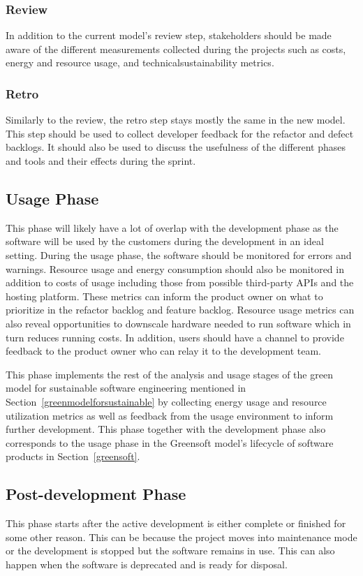 \subsubsection{Review}
In addition to the current model's review step, stakeholders should be made aware of the different measurements collected during the projects such as costs, energy and resource usage, and \gls{technicalsustainability} metrics.

\subsubsection{Retro}
Similarly to the review, the retro step stays mostly the same in the new model. This step should be used to collect developer feedback for the refactor and defect backlogs. It should also be used to discuss the usefulness of the different phases and tools and their effects during the sprint.

\subsection{Usage Phase}
This phase will likely have a lot of overlap with the development phase as the software will be used by the customers during the development in an ideal setting. During the usage phase, the software should be monitored for errors and warnings. Resource usage and energy consumption should also be monitored in addition to costs of usage including those from possible third-party APIs and the hosting platform. These metrics can inform the product owner on what to prioritize in the refactor backlog and feature backlog. Resource usage metrics can also reveal opportunities to downscale hardware needed to run software which in turn reduces running costs. In addition, users should have a channel to provide feedback to the product owner who can relay it to the development team.

This phase implements the rest of the analysis and usage stages of the green model for sustainable software engineering mentioned in Section~\ref{greenmodelforsustainable} by collecting energy usage and resource utilization metrics as well as feedback from the usage environment to inform further development. This phase together with the development phase also corresponds to the usage phase in the Greensoft model's lifecycle of software products in Section~\ref{greensoft}.

\subsection{Post-development Phase}
This phase starts after the active development is either complete or finished for some other reason. This can be because the project moves into maintenance mode or the development is stopped but the software remains in use. This can also happen when the software is deprecated and is ready for disposal.

